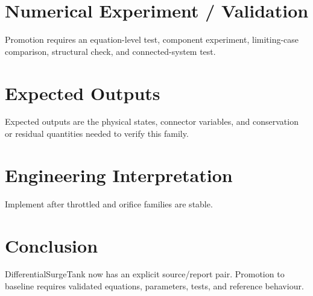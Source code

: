 \documentclass[10pt,a4paper]{article}
\begin{document}
\section{Numerical Experiment / Validation}Promotion requires an equation-level test, component experiment, limiting-case comparison, structural check, and connected-system test.
\section{Expected Outputs}Expected outputs are the physical states, connector variables, and conservation or residual quantities needed to verify this family.
\section{Engineering Interpretation}Implement after throttled and orifice families are stable.
\section*{Conclusion}DifferentialSurgeTank now has an explicit source/report pair. Promotion to baseline requires validated equations, parameters, tests, and reference behaviour.
\end{document}
